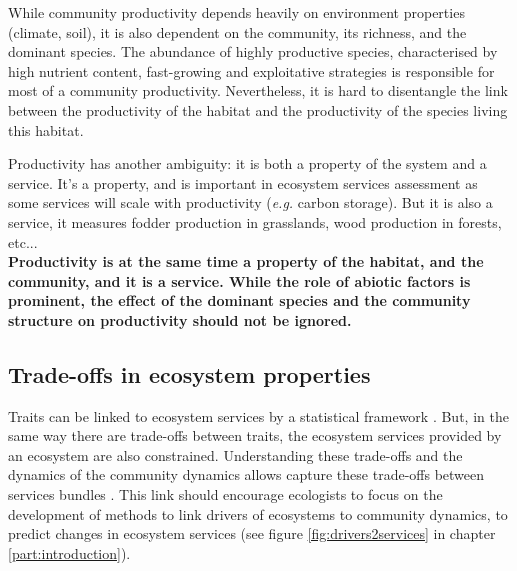 While community productivity depends heavily on environment properties (climate, soil), it is also dependent on the community, its richness, and the dominant species. The abundance of highly productive species, characterised by high nutrient content, fast-growing and exploitative strategies is responsible for most of a community productivity. Nevertheless, it is hard to disentangle the link between the productivity of the habitat and the productivity of the species living this habitat.

Productivity has another ambiguity: it is both a property of the system and a service. It's a property, and is important in ecosystem services assessment as some services will scale with productivity (\textit{e.g.} carbon storage). But it is also a service, it measures fodder production in grasslands, wood production in forests, etc...\\



\textbf{Productivity is at the same time a property of the habitat, and the community, and it is a service. While the role of abiotic factors is prominent, the effect of the dominant species and the community structure on productivity should not be ignored. }

\subsection{Trade-offs in ecosystem properties}

Traits can be linked to ecosystem services by a statistical framework \parencite{lavorel_how_2012}. But, in the same way there are trade-offs between traits, the ecosystem services provided by an ecosystem are also constrained. Understanding these trade-offs and the dynamics of the community dynamics allows capture these trade-offs between services bundles \parencite{lamarque_plant_2014}. This link should encourage ecologists to focus on the development of methods to link drivers of ecosystems to community dynamics, to predict changes in ecosystem services (see figure \ref{fig:drivers2services} in chapter \ref{part:introduction}).\\



